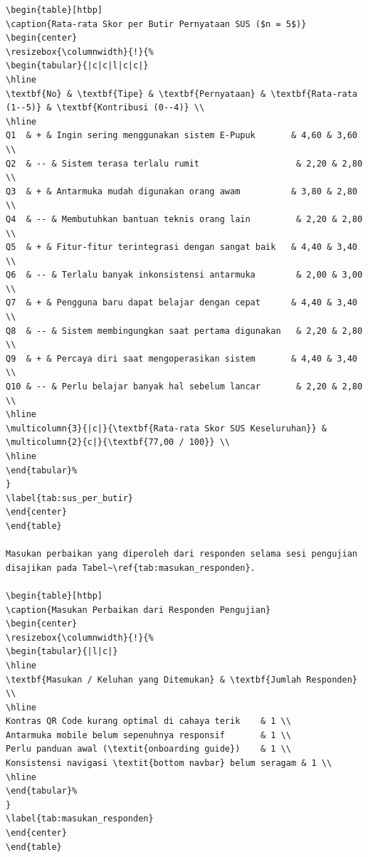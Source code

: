 \documentclass[conference]{IEEEtran}
\begin{document}
\begin{lstlisting}
\begin{table}[htbp]
\caption{Rata-rata Skor per Butir Pernyataan SUS ($n = 5$)}
\begin{center}
\resizebox{\columnwidth}{!}{%
\begin{tabular}{|c|c|l|c|c|}
\hline
\textbf{No} & \textbf{Tipe} & \textbf{Pernyataan} & \textbf{Rata-rata (1--5)} & \textbf{Kontribusi (0--4)} \\
\hline
Q1  & + & Ingin sering menggunakan sistem E-Pupuk       & 4,60 & 3,60 \\
Q2  & -- & Sistem terasa terlalu rumit                   & 2,20 & 2,80 \\
Q3  & + & Antarmuka mudah digunakan orang awam          & 3,80 & 2,80 \\
Q4  & -- & Membutuhkan bantuan teknis orang lain         & 2,20 & 2,80 \\
Q5  & + & Fitur-fitur terintegrasi dengan sangat baik   & 4,40 & 3,40 \\
Q6  & -- & Terlalu banyak inkonsistensi antarmuka        & 2,00 & 3,00 \\
Q7  & + & Pengguna baru dapat belajar dengan cepat      & 4,40 & 3,40 \\
Q8  & -- & Sistem membingungkan saat pertama digunakan   & 2,20 & 2,80 \\
Q9  & + & Percaya diri saat mengoperasikan sistem       & 4,40 & 3,40 \\
Q10 & -- & Perlu belajar banyak hal sebelum lancar       & 2,20 & 2,80 \\
\hline
\multicolumn{3}{|c|}{\textbf{Rata-rata Skor SUS Keseluruhan}} & \multicolumn{2}{c|}{\textbf{77,00 / 100}} \\
\hline
\end{tabular}%
}
\label{tab:sus_per_butir}
\end{center}
\end{table}

Masukan perbaikan yang diperoleh dari responden selama sesi pengujian disajikan pada Tabel~\ref{tab:masukan_responden}.

\begin{table}[htbp]
\caption{Masukan Perbaikan dari Responden Pengujian}
\begin{center}
\resizebox{\columnwidth}{!}{%
\begin{tabular}{|l|c|}
\hline
\textbf{Masukan / Keluhan yang Ditemukan} & \textbf{Jumlah Responden} \\
\hline
Kontras QR Code kurang optimal di cahaya terik    & 1 \\
Antarmuka mobile belum sepenuhnya responsif       & 1 \\
Perlu panduan awal (\textit{onboarding guide})    & 1 \\
Konsistensi navigasi \textit{bottom navbar} belum seragam & 1 \\
\hline
\end{tabular}%
}
\label{tab:masukan_responden}
\end{center}
\end{table}


\end{lstlisting}
\end{document}
